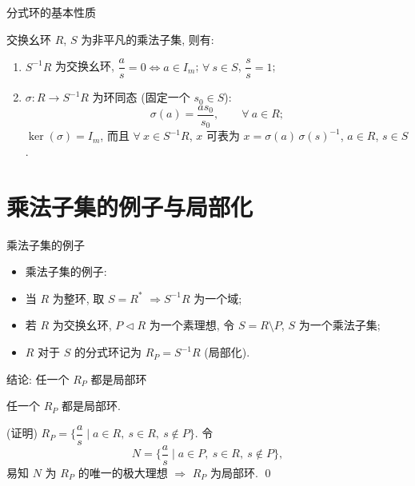 \begin{frame}{分式环的基本性质}

\begin{lem}[分式环]
交换幺环 $R$, $S$ 为非平凡的乘法子集, 则有:
\begin{enumerate}
\item[(i)] $S^{-1} R$ 为交换幺环,
  $\dfrac{a}{s} = 0 \iff a \in I_m$;
  $\forall\ s \in S$, $\dfrac{s}{s} = 1$;
\item[(ii)] $\sigma: R \to S^{-1} R$ 为环同态 (固定一个 $s_0 \in S$):
  \[
  \sigma(a) = \frac{a s_0}{s_0},
  \qquad \forall\ a \in R ;
  \]
  $\ker(\sigma) = I_m$, 而且 $\forall\ x \in S^{-1} R$, $x$ 可表为
  $x = \sigma(a) \, \sigma(s)^{-1}$,
  $a \in R$, $s \in S$.
\end{enumerate}
\end{lem}

\end{frame}


\section[局部化]{乘法子集的例子与局部化}


\begin{frame}{乘法子集的例子}

\begin{itemize}
\item 乘法子集的例子:
\item[\circled{1}.] 当 $R$ 为整环, 取 $S = R^{*}$
  $\Longrightarrow S^{-1} R$ 为一个域;
\item[\circled{2}.] 若 $R$ 为交换幺环, $P \lhd R$ 为一个素理想, 令 $S = R \setminus P$,
  $S$ 为一个乘法子集;
\item $R$ 对于 $S$ 的分式环记为 $R_P = S^{-1} R$ (局部化).
\end{itemize}

\end{frame}


\begin{frame}{结论: 任一个 $R_P$ 都是局部环}

\begin{thm}
任一个 $R_P$ 都是局部环.
\end{thm}

\startproof[bg=yellow, fg=red](证明)
$R_P = \Big\{ \dfrac{a}{s} \;\Big|\; a \in R,\ s \in R,\ s \notin P \Big\}$.
令
\[
N = \Big\{ \frac{a}{s} \;\Big|\; a \in P,\ s \in R,\ s \notin P \Big\} ,
\]
易知 $N$ 为 $R_P$ 的唯一的极大理想 $\Longrightarrow$ $R_P$ 为局部环.
\qed

\end{frame}

